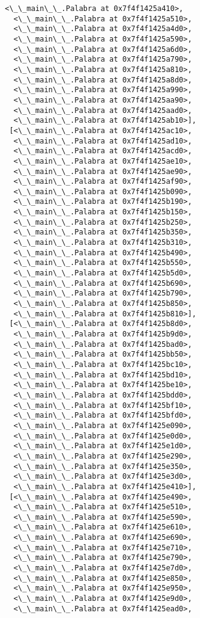 \documentclass[12pt,a4paper,table]{article}
\begin{document}
\begin{tcolorbox}[breakable, size=fbox, boxrule=.5pt, pad at break*=1mm, opacityfill=0]
\begin{Verbatim}[commandchars=\\\{\}]
  <\_\_main\_\_.Palabra at 0x7f4f1425a410>,
  <\_\_main\_\_.Palabra at 0x7f4f1425a510>,
  <\_\_main\_\_.Palabra at 0x7f4f1425a4d0>,
  <\_\_main\_\_.Palabra at 0x7f4f1425a590>,
  <\_\_main\_\_.Palabra at 0x7f4f1425a6d0>,
  <\_\_main\_\_.Palabra at 0x7f4f1425a790>,
  <\_\_main\_\_.Palabra at 0x7f4f1425a810>,
  <\_\_main\_\_.Palabra at 0x7f4f1425a8d0>,
  <\_\_main\_\_.Palabra at 0x7f4f1425a990>,
  <\_\_main\_\_.Palabra at 0x7f4f1425aa90>,
  <\_\_main\_\_.Palabra at 0x7f4f1425aad0>,
  <\_\_main\_\_.Palabra at 0x7f4f1425ab10>],
 [<\_\_main\_\_.Palabra at 0x7f4f1425ac10>,
  <\_\_main\_\_.Palabra at 0x7f4f1425ad10>,
  <\_\_main\_\_.Palabra at 0x7f4f1425acd0>,
  <\_\_main\_\_.Palabra at 0x7f4f1425ae10>,
  <\_\_main\_\_.Palabra at 0x7f4f1425ae90>,
  <\_\_main\_\_.Palabra at 0x7f4f1425af90>,
  <\_\_main\_\_.Palabra at 0x7f4f1425b090>,
  <\_\_main\_\_.Palabra at 0x7f4f1425b190>,
  <\_\_main\_\_.Palabra at 0x7f4f1425b150>,
  <\_\_main\_\_.Palabra at 0x7f4f1425b250>,
  <\_\_main\_\_.Palabra at 0x7f4f1425b350>,
  <\_\_main\_\_.Palabra at 0x7f4f1425b310>,
  <\_\_main\_\_.Palabra at 0x7f4f1425b490>,
  <\_\_main\_\_.Palabra at 0x7f4f1425b550>,
  <\_\_main\_\_.Palabra at 0x7f4f1425b5d0>,
  <\_\_main\_\_.Palabra at 0x7f4f1425b690>,
  <\_\_main\_\_.Palabra at 0x7f4f1425b790>,
  <\_\_main\_\_.Palabra at 0x7f4f1425b850>,
  <\_\_main\_\_.Palabra at 0x7f4f1425b810>],
 [<\_\_main\_\_.Palabra at 0x7f4f1425b8d0>,
  <\_\_main\_\_.Palabra at 0x7f4f1425b9d0>,
  <\_\_main\_\_.Palabra at 0x7f4f1425bad0>,
  <\_\_main\_\_.Palabra at 0x7f4f1425bb50>,
  <\_\_main\_\_.Palabra at 0x7f4f1425bc10>,
  <\_\_main\_\_.Palabra at 0x7f4f1425bd10>,
  <\_\_main\_\_.Palabra at 0x7f4f1425be10>,
  <\_\_main\_\_.Palabra at 0x7f4f1425bdd0>,
  <\_\_main\_\_.Palabra at 0x7f4f1425bf10>,
  <\_\_main\_\_.Palabra at 0x7f4f1425bfd0>,
  <\_\_main\_\_.Palabra at 0x7f4f1425e090>,
  <\_\_main\_\_.Palabra at 0x7f4f1425e0d0>,
  <\_\_main\_\_.Palabra at 0x7f4f1425e1d0>,
  <\_\_main\_\_.Palabra at 0x7f4f1425e290>,
  <\_\_main\_\_.Palabra at 0x7f4f1425e350>,
  <\_\_main\_\_.Palabra at 0x7f4f1425e3d0>,
  <\_\_main\_\_.Palabra at 0x7f4f1425e410>],
 [<\_\_main\_\_.Palabra at 0x7f4f1425e490>,
  <\_\_main\_\_.Palabra at 0x7f4f1425e510>,
  <\_\_main\_\_.Palabra at 0x7f4f1425e590>,
  <\_\_main\_\_.Palabra at 0x7f4f1425e610>,
  <\_\_main\_\_.Palabra at 0x7f4f1425e690>,
  <\_\_main\_\_.Palabra at 0x7f4f1425e710>,
  <\_\_main\_\_.Palabra at 0x7f4f1425e790>,
  <\_\_main\_\_.Palabra at 0x7f4f1425e7d0>,
  <\_\_main\_\_.Palabra at 0x7f4f1425e850>,
  <\_\_main\_\_.Palabra at 0x7f4f1425e950>,
  <\_\_main\_\_.Palabra at 0x7f4f1425e9d0>,
  <\_\_main\_\_.Palabra at 0x7f4f1425ead0>,

\end{Verbatim}
\end{tcolorbox}
\end{document}

